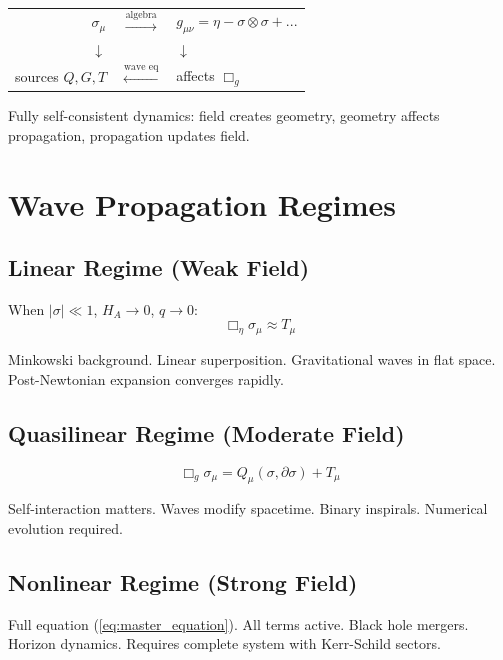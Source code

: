\documentclass[11pt,a4paper]{article}
\theoremstyle{definition}
\theoremstyle{remark}
\begin{document}
		\begin{center}
			\begin{tabular}{rcl}
				$\sigma_\mu$ & $\xrightarrow{\text{algebra}}$ & $g_{\mu\nu} = \eta - \sigma\otimes\sigma + ...$\\
				$\downarrow$ & & $\downarrow$\\
				sources $Q,G,T$ & $\xleftarrow{\text{wave eq}}$ & affects $\Box_g$\\
			\end{tabular}
		\end{center}
		
		Fully self-consistent dynamics: field creates geometry, geometry affects propagation, propagation updates field.
		
		\section{Wave Propagation Regimes}
		
		\subsection{Linear Regime (Weak Field)}
		
		When $|\sigma| \ll 1$, $H_A \to 0$, $q \to 0$:
		\begin{equation}
			\Box_\eta\sigma_\mu \approx T_\mu
		\end{equation}
		
		Minkowski background. Linear superposition. Gravitational waves in flat space. Post-Newtonian expansion converges rapidly.
		
		\subsection{Quasilinear Regime (Moderate Field)}
		
		\begin{equation}
			\Box_g\sigma_\mu = Q_\mu(\sigma,\partial\sigma) + T_\mu
		\end{equation}
		
		Self-interaction matters. Waves modify spacetime. Binary inspirals. Numerical evolution required.
		
		\subsection{Nonlinear Regime (Strong Field)}
		
		Full equation (\ref{eq:master_equation}). All terms active. Black hole mergers. Horizon dynamics. Requires complete system with Kerr-Schild sectors.
		
\end{document}
